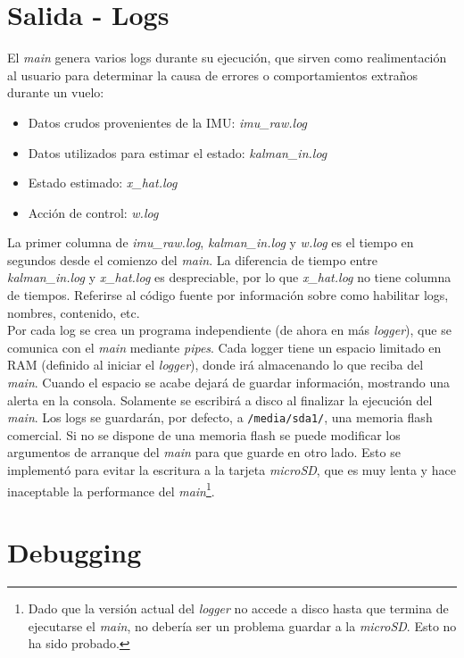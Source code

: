 \documentclass[main]{subfiles}
\begin{document}
\section{Salida - Logs}
\label{salidas-logs}

El \textit{main} genera varios logs durante su ejecución, que sirven como realimentación al usuario para determinar la causa de errores o comportamientos extraños durante un vuelo:
\begin{itemize}
\item Datos crudos provenientes de la IMU: \textit{imu\_raw.log}
\item Datos utilizados para estimar el estado: \textit{kalman\_in.log}
\item Estado estimado: \textit{x\_hat.log}
\item Acción de control: \textit{w.log}
\end{itemize}

La primer columna de \textit{imu\_raw.log}, \textit{kalman\_in.log} y \textit{w.log} es el tiempo en segundos desde el comienzo del \textit{main}. La diferencia de tiempo entre \textit{kalman\_in.log} y \textit{x\_hat.log} es despreciable, por lo que \textit{x\_hat.log} no tiene columna de tiempos. Referirse al código fuente por información sobre como habilitar logs, nombres, contenido, etc.\\

Por cada log se crea un programa independiente (de ahora en m\'as \textit{logger}), que se comunica con el \textit{main} mediante \textit{pipes}. Cada logger tiene un espacio limitado en RAM (definido al iniciar el \textit{logger}), donde ir\'a almacenando lo que reciba del \textit{main}. Cuando el espacio se acabe dejará de guardar información, mostrando una alerta en la consola. Solamente se escribir\'a a disco al finalizar la ejecuci\'on del \textit{main}. Los logs se guardar\'an, por defecto, a \verb+/media/sda1/+, una memoria flash comercial. Si no se dispone de una memoria flash se puede modificar los argumentos de arranque del \textit{main} para que guarde en otro lado. Esto se implement\'o para evitar la escritura a la tarjeta \textit{microSD}, que es muy lenta y hace inaceptable la performance del \textit{main}\footnote{Dado que la versi\'on actual del \textit{logger} no accede a disco hasta que termina de ejecutarse el \textit{main}, no deber\'ia ser un problema guardar a la \textit{microSD}. Esto no ha sido probado.
}.\\

\section{Debugging}
\label{sec:codigo:debugging}
\end{document}
